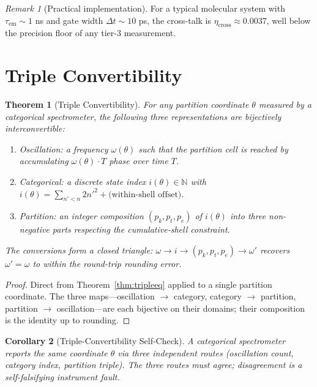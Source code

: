 \documentclass[11pt,a4paper]{article}
\theoremstyle{thmstyle}
\newtheorem{theorem}{Theorem}[section]
\newtheorem{corollary}[theorem]{Corollary}
\theoremstyle{axiomstyle}
\theoremstyle{definition}
\theoremstyle{remark}
\newtheorem*{remark}{Remark}
\newcommand{\Natural}{\mathbb{N}}
\begin{document}
\begin{remark}[Practical implementation]
For a typical molecular system with $\tau_{\mathrm{em}}\sim 1$ ns and gate width $\Delta t\sim 10$ ps, the cross-talk is $\eta_{\mathrm{cross}}\approx 0.0037$, well below the precision floor of any tier-3 measurement.
\end{remark}

\section{Triple Convertibility}
\label{sec:tripleconv}

\begin{theorem}[Triple Convertibility]\label{thm:tripleconv}
For any partition coordinate $\theta$ measured by a categorical spectrometer, the following three representations are bijectively interconvertible:
\begin{enumerate}[label=(\alph*),nosep]
\item \emph{Oscillation:} a frequency $\omega(\theta)$ such that the partition cell is reached by accumulating $\omega(\theta)\cdot T$ phase over time $T$.
\item \emph{Categorical:} a discrete state index $i(\theta)\in\Natural$ with $i(\theta)=\sum_{n'<n}2n'^{2}+\text{(within-shell offset)}$.
\item \emph{Partition:} an integer composition $(p_{k},p_{t},p_{e})$ of $i(\theta)$ into three non-negative parts respecting the cumulative-shell constraint.
\end{enumerate}
The conversions form a closed triangle: $\omega\to i\to(p_{k},p_{t},p_{e})\to\omega'$ recovers $\omega'=\omega$ to within the round-trip rounding error.
\end{theorem}

\begin{proof}
Direct from Theorem~\ref{thm:tripleeq} applied to a single partition coordinate. The three maps---oscillation $\to$ category, category $\to$ partition, partition $\to$ oscillation---are each bijective on their domains; their composition is the identity up to rounding.
\end{proof}

\begin{corollary}[Triple-Convertibility Self-Check]\label{cor:tripleself}
A categorical spectrometer reports the same coordinate $\theta$ via three independent routes (oscillation count, category index, partition triple). The three routes must agree; disagreement is a self-falsifying instrument fault.
\end{corollary}
\end{document}
